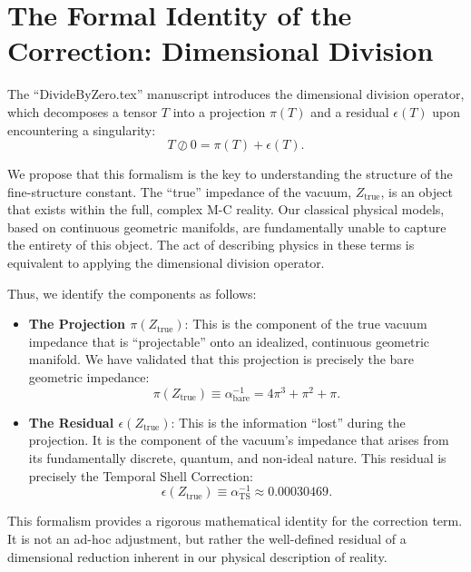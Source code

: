 \documentclass[11pt,a4paper]{article}
\begin{document}
\section{The Formal Identity of the Correction: Dimensional Division}

The ``DivideByZero.tex'' manuscript introduces the dimensional division operator, which decomposes a tensor $T$ into a projection $\pi(T)$ and a residual $\epsilon(T)$ upon encountering a singularity:
\begin{equation}
    T \oslash 0 = \pi(T) + \epsilon(T).
\end{equation}

We propose that this formalism is the key to understanding the structure of the fine-structure constant. The ``true'' impedance of the vacuum, $Z_{\text{true}}$, is an object that exists within the full, complex M-C reality. Our classical physical models, based on continuous geometric manifolds, are fundamentally unable to capture the entirety of this object. The act of describing physics in these terms is equivalent to applying the dimensional division operator.

Thus, we identify the components as follows:
\begin{itemize}
    \item \textbf{The Projection $\pi(Z_{\text{true}})$}: This is the component of the true vacuum impedance that is ``projectable'' onto an idealized, continuous geometric manifold. We have validated that this projection is precisely the bare geometric impedance:
    \begin{equation}
        \pi(Z_{\text{true}}) \equiv \alpha^{-1}_{\text{bare}} = 4\pi^3 + \pi^2 + \pi.
    \end{equation}
    
    \item \textbf{The Residual $\epsilon(Z_{\text{true}})$}: This is the information ``lost'' during the projection. It is the component of the vacuum's impedance that arises from its fundamentally discrete, quantum, and non-ideal nature. This residual is precisely the Temporal Shell Correction:
    \begin{equation}
        \epsilon(Z_{\text{true}}) \equiv \alpha^{-1}_{\text{TS}} \approx 0.00030469.
    \end{equation}
\end{itemize}
This formalism provides a rigorous mathematical identity for the correction term. It is not an ad-hoc adjustment, but rather the well-defined residual of a dimensional reduction inherent in our physical description of reality.
\end{document}
